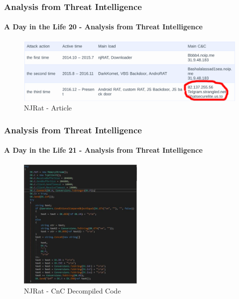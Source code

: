 \documentclass[aspectratio=169]{beamer}
\begin{document}
\begin{frame}
  \frametitle{Analysis from Threat Intelligence}
  \framesubtitle{A Day in the Life 20 - Analysis from Threat Intelligence}
  \begin{center}
    \begin{figure}
      \includegraphics[width=14cm,keepaspectratio]{njrat_article}
      \caption{NJRat - Article}
    \end{figure}
  \end{center}
\end{frame}

\begin{frame}
  \frametitle{Analysis from Threat Intelligence}
  \framesubtitle{A Day in the Life 21 - Analysis from Threat Intelligence}
  \begin{center}
    \begin{figure}
      \includegraphics[width=6cm,keepaspectratio]{njrat_cnc}
      \caption{NJRat - CnC Decompiled Code}
    \end{figure}
  \end{center}
\end{frame}
\end{document}

